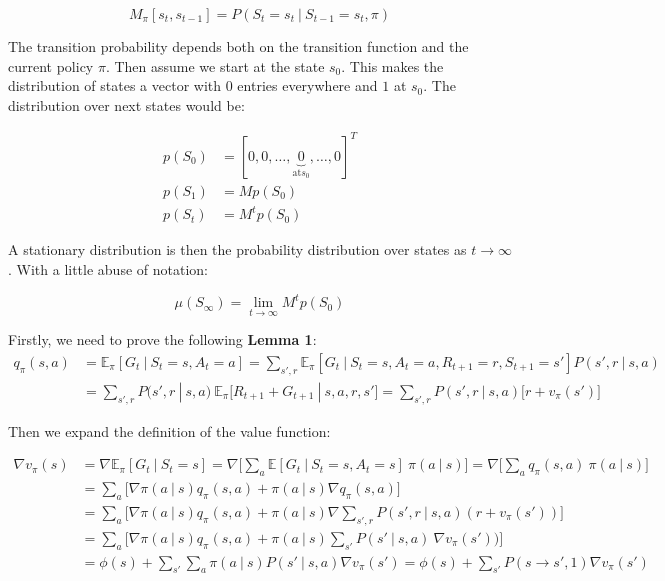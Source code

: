 \documentclass{article}
\newcommand{\giv}{\ |\ }
\begin{document}
\begin{equation*}
    M_\pi[s_{t}, s_{t - 1}] =
        P(S_t = s_{t} \giv S_{t - 1} = s_{t}, \pi) 
\end{equation*}

The transition probability depends both on the transition function and the current policy $\pi$. Then assume we start at the state $s_0$. This makes the distribution of states a vector with $0$ entries everywhere and $1$ at $s_0$. The distribution over next states would be:

\begin{align*}
    p(S_0) &= [0, 0, \dots, \underbrace{0}_{\text{at} s_0}, \dots, 0]^T \\
    p(S_1) &= M p(S_0) \\
    p(S_t) &= M^t p(S_0)
\end{align*}

A stationary distribution is then the probability distribution over states as $t \to \infty$. With a little abuse of notation:

\begin{equation}
    \mu(S_\infty) = \lim_{t \to \infty} M^t p(S_0)
\end{equation}

Firstly, we need to prove the following \textbf{Lemma 1}:
\begin{align*} 
    q_\pi(s, a) &= \mathbb{E}_\pi[G_t \giv S_t = s, A_t = a] =
        \sum_{s', r} \mathbb{E}_\pi [
            G_t \giv S_t = s, A_t = a, R_{t + 1} = r, S_{t + 1} = s'
        ] P(s', r \giv s, a) \\
    &= \sum_{s', r} P(s', r \giv s, a)\ \mathbb{E}_\pi \big[
        R_{t + 1} + G_{t + 1} \giv s, a, r, s'
    \big] = \sum_{s', r} P(s', r \giv s, a) \big[r + v_\pi(s')\big]
\end{align*} 

Then we expand the definition of the value function:

\begin{align*}
    \nabla v_\pi(s) &= \nabla\mathbb{E}_\pi[G_t \giv S_t = s] =
        \nabla \bigg[\sum_a \mathbb{E}[G_t \giv S_t = s, A_t = s]\ \pi(a \giv s) \bigg]
    = \nabla \bigg[\sum_a q_\pi(s, a)\ \pi(a \giv s) \bigg] \\
    &= \sum_a \bigg[ \nabla \pi(a \giv s) q_\pi (s, a) + 
        \pi(a \giv s) \nabla q_\pi(s, a) \bigg] \\
    &= \sum_a \bigg[ \nabla \pi(a \giv s) q_\pi (s, a) + 
        \pi(a \giv s) \nabla \sum_{s', r} P(s', r \giv s, a) (r + v_\pi(s')) \bigg] \\
    &= \sum_a \bigg[ \nabla \pi(a \giv s) q_\pi (s, a) + 
        \pi(a \giv s) \sum_{s'} P(s' \giv s, a)\ \nabla v_\pi(s')) \bigg] \\
    &= \phi(s) + \sum_{s'} \sum_a \pi(a \giv s) P(s' \giv s, a) \nabla v_\pi(s')
        = \phi(s) + \sum_{s'} P(s \to s', 1) \nabla v_\pi(s') \\
\end{align*}
\end{document}

